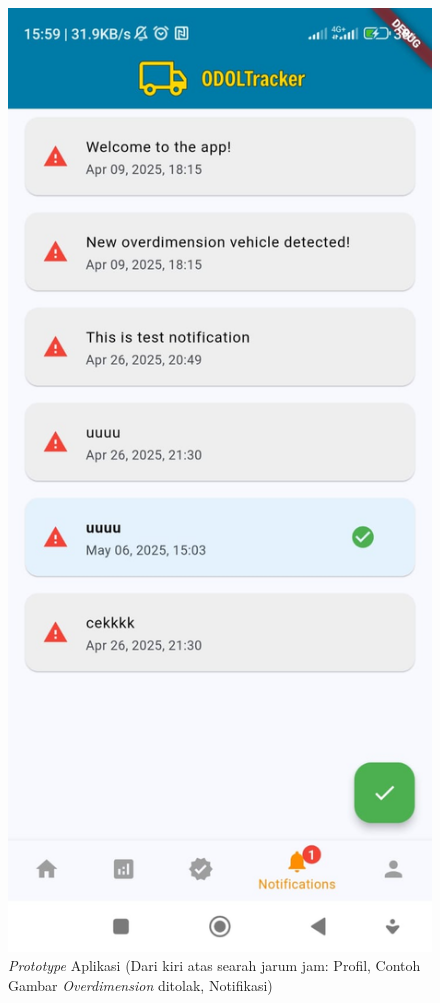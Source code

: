 \begin{figure}[htbp]
  \includegraphics[scale=0.2]{gambar/bab3-notification.jpeg}
  \caption{\centering \emph{Prototype} Aplikasi (Dari kiri atas searah jarum jam: Profil, Contoh Gambar \emph{Overdimension} ditolak, Notifikasi)}
  \label{fig:profile}
\end{figure}

